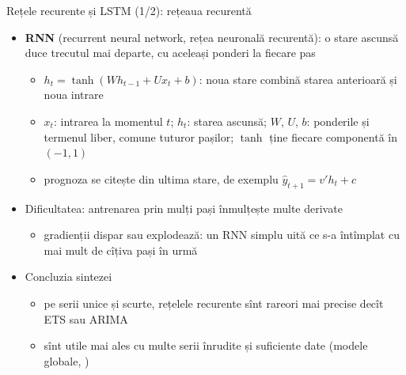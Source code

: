 \begin{frame}{Rețele recurente și LSTM (1/2): rețeaua recurentă}
\itemsize{\footnotesize}
\begin{itemize}
    \item \textbf{RNN} (recurrent neural network, rețea neuronală recurentă): o stare ascunsă duce trecutul mai departe, cu aceleași ponderi la fiecare pas
    \begin{itemize}
        \item $h_t = \tanh(Wh_{t-1} + Ux_t + b)$: noua stare combină starea anterioară și noua intrare
        \item $x_t$: intrarea la momentul $t$; $h_t$: starea ascunsă; $W$, $U$, $b$: ponderile și termenul liber, comune tuturor pașilor; $\tanh$ ține fiecare componentă în $(-1, 1)$
        \item prognoza se citește din ultima stare, de exemplu $\hat y_{t+1} = v'h_t + c$
    \end{itemize}
    \item Dificultatea: antrenarea prin mulți pași înmulțește multe derivate
    \begin{itemize}
        \item gradienții dispar sau explodează: un RNN simplu uită ce s-a întîmplat cu mai mult de cîțiva pași în urmă
    \end{itemize}
    \item Concluzia sintezei 
    \begin{itemize}
        \item pe serii unice și scurte, rețelele recurente sînt rareori mai precise decît ETS sau ARIMA
        \item sînt utile mai ales cu multe serii înrudite și suficiente date (modele globale, )
    \end{itemize}
\end{itemize}
\end{frame}

